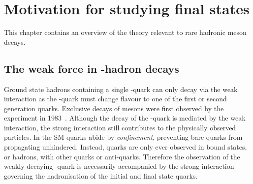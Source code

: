 \chapter{Motivation for studying \decay{\Bp}{\Dsp\Kp\Km} final states} 
\label{ch:theory}

\minitoc


This chapter contains an overview of the theory relevant to rare hadronic \B meson decays.





\section{The weak force in \bquark-hadron decays}

Ground state hadrons containing a single \bquark-quark can only decay via the weak interaction as the \bquark-quark must change flavour to one of the first or second generation quarks.
Exclusive decays of \B mesons were first observed by the \cleo experiment in 1983~\cite{PhysRevLett.50.881}. 
Although the decay of the \bquark-quark is mediated by the weak interaction, the strong interaction still contributes to the physically observed particles.  
In the SM quarks abide by \emph{confinement}, preventing bare quarks from propagating unhindered. Instead, quarks are only ever observed in bound states, or hadrons, with other quarks or anti-quarks. Therefore the observation of the weakly decaying \bquark-quark is necessarily accompanied by the strong interaction governing the hadronisation of the initial and final state quarks.


